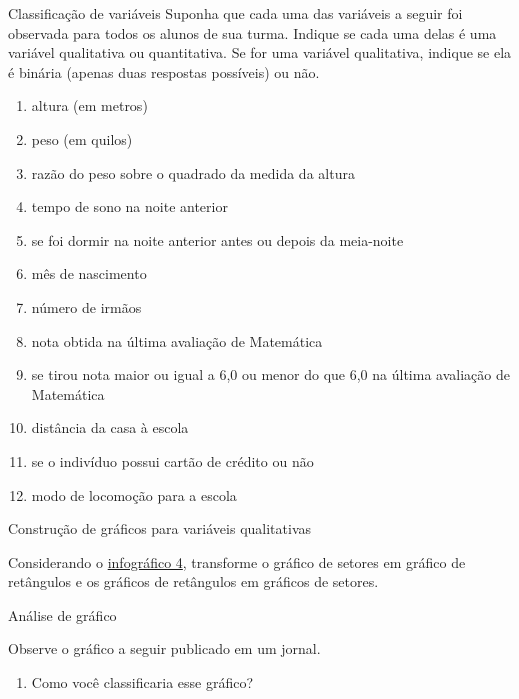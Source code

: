 {\begin{task}{ Classificação de variáveis}
Suponha que cada uma das variáveis a seguir foi observada para todos os alunos de sua turma. Indique se cada uma delas é uma variável qualitativa ou quantitativa. Se for uma variável qualitativa, indique se ela é binária (apenas duas respostas possíveis) ou não.
\begin{enumerate}
\item {} 
altura (em metros)

\item {} 
peso (em quilos)

\item {} 
razão do peso sobre o quadrado da medida da altura

\item {} 
tempo de sono na noite anterior

\item {} 
se foi dormir na noite anterior antes ou depois da meia-noite

\item {} 
mês de nascimento

\item {} 
número de irmãos

\item {} 
nota obtida na última avaliação de Matemática

\item {} 
se tirou nota maior ou igual a 6,0 ou menor do que 6,0 na última avaliação de Matemática

\item {} 
distância da casa à escola

\item {} 
se o indivíduo possui cartão de crédito ou não

\item {} 
modo de locomoção para a escola

\end{enumerate}
\end{task}
\label{est1-ativ-7}
\begin{task}{ Construção de gráficos para variáveis qualitativas}

Considerando o \hyperref[est1-fig-5]{infográfico 4}, transforme o gráfico de setores em gráfico de retângulos e os gráficos de retângulos em gráficos de setores.
\end{task}

\label{est1-ativ-8}
\begin{task}{ Análise de gráfico}

Observe o gráfico a seguir publicado em um jornal.
\begin{enumerate}
\item {} 
Como você classificaria esse gráfico?


\end{enumerate}
\end{task}}
